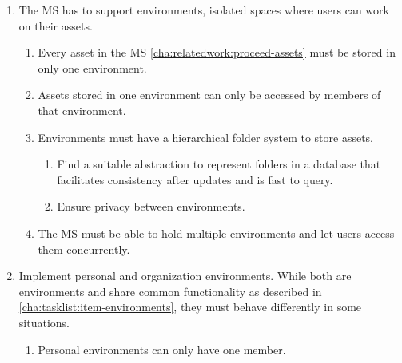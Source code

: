 \begin{enumerate}
	\item The MS has to support environments, isolated spaces where users can work on their
	      assets. \label{cha:tasklist:item-environments}
	      \begin{enumerate}
		      \item Every asset in the MS \ref{cha:relatedwork:proceed-assets} must be stored in only one environment.

		      \item Assets stored in one environment can only be accessed by members of that
		            environment.

		      \item Environments must have a hierarchical folder system to store assets.
		            \begin{enumerate}
			            \item Find a suitable abstraction to represent folders in a database
			                  that facilitates consistency after updates and is fast to query.

			            \item Ensure privacy between environments.


		            \end{enumerate}

		      \item The MS must be able to hold multiple environments and let users access them concurrently.

	      \end{enumerate}

	\item Implement personal and organization environments. While both are environments
	      and share common functionality as described in
	      \ref{cha:tasklist:item-environments}, they must behave differently in some
	      situations.
	      \begin{enumerate}
		      \item Personal environments can only have one member.


\end{enumerate}
\end{enumerate}
